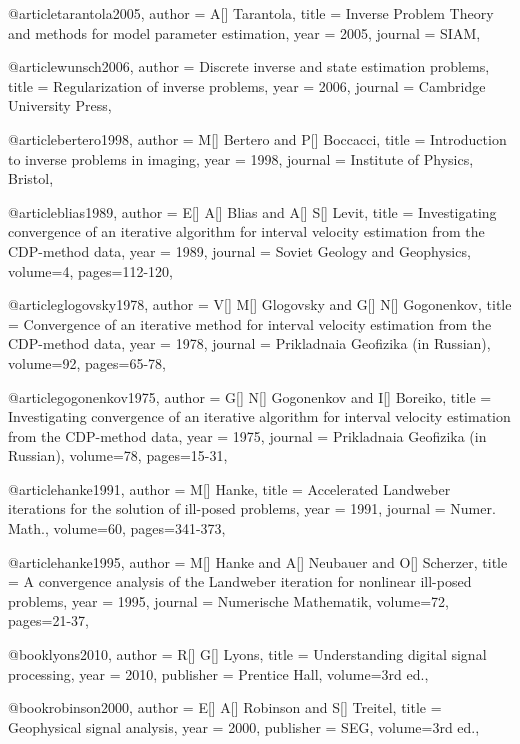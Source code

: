 {@article{tarantola2005,
  author =	 {A[] Tarantola},
  title =	 {Inverse Problem Theory and methods for model parameter estimation},
  year =	 2005,
  journal =	 {SIAM},
}

@article{wunsch2006,
  author =	 {Discrete inverse and state estimation problems},
  title =	 {Regularization of inverse problems},
  year =	 2006,
  journal =	 {Cambridge University Press},
}


@article{bertero1998,
  author =	 {M[] Bertero and P[] Boccacci},
  title =	 {Introduction to inverse problems in imaging},
  year =	 1998,
  journal =	 {Institute of Physics, Bristol},
}

@article{blias1989,
  author =	 {E[] A[] Blias and A[] S[] Levit},
  title =	 {Investigating convergence of an iterative algorithm for interval velocity estimation from the CDP-method data},
  year =	 1989,
  journal =	 {Soviet Geology and Geophysics},
  volume={4},
 pages=112-120,
}


@article{glogovsky1978,
  author =	 {V[] M[] Glogovsky and G[] N[] Gogonenkov},
  title =	 {Convergence of an iterative method for interval velocity estimation from the CDP-method data},
  year =	 1978,
  journal =	 {Prikladnaia Geofizika (in Russian)},
  volume={92},
 pages=65-78,
}


@article{gogonenkov1975,
  author =	 {G[] N[] Gogonenkov and I[] Boreiko},
  title =	 {Investigating convergence of an iterative algorithm for interval velocity estimation from the CDP-method data},
  year =	 1975,
  journal =	 {Prikladnaia Geofizika (in Russian)},
  volume={78},
 pages=15-31,
}


@article{hanke1991,
  author =	 {M[] Hanke},
  title =	 {Accelerated Landweber iterations for the solution of ill-posed problems},
  year =	 1991,
  journal =	 {Numer. Math.},
  volume={60},
 pages=341-373,
}


@article{hanke1995,
  author =	 {M[] Hanke and A[] Neubauer and O[] Scherzer},
  title =	 {A convergence analysis of the Landweber iteration for nonlinear ill-posed problems},
  year =	 1995,
  journal =	 {Numerische Mathematik},
  volume={72},
 pages=21-37,
}

@book{lyons2010,
  author =	 {R[] G[] Lyons},
  title =	 {Understanding digital signal processing},
  year =	 2010,
  publisher =	 {Prentice Hall},
  volume={3rd ed.},
}

@book{robinson2000,
  author =	 {E[] A[] Robinson and S[] Treitel},
  title =	 {Geophysical signal analysis},
  year =	 2000,
  publisher =	 {SEG},
  volume={3rd ed.},
}

}
